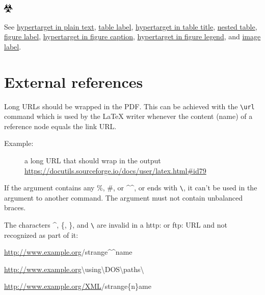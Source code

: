 \documentclass[a4paper]{article}
\newenvironment{DUlineblock}[1]{%
    \list{}{\setlength{\partopsep}{\parskip}
            \addtolength{\partopsep}{\baselineskip}
            \setlength{\topsep}{0pt}
            \setlength{\itemsep}{0.15\baselineskip}
            \setlength{\parsep}{0pt}
            \setlength{\leftmargin}{#1}}
    \raggedright
  }
  {\endlist}
\begin{document}
\includegraphics{../../../docs/user/rst/images/biohazard.png}
\label{image-label}

See \hyperref[hypertarget-in-plain-text]{hypertarget in plain text},
\hyperref[table-label]{table label}, \hyperref[hypertarget-in-table-title]{hypertarget in table title},
\hyperref[nested-table]{nested table},
\hyperref[figure-label]{figure label}, \hyperref[hypertarget-in-figure-caption]{hypertarget in figure caption},
\hyperref[hypertarget-in-figure-legend]{hypertarget in figure legend}, and
\hyperref[image-label]{image label}.


\section{External references%
  \label{external-references}%
}

Long URLs should be wrapped in the PDF. This can be achieved with the
\texttt{\textbackslash{}url} command which is used by the LaTeX writer whenever the content
(name) of a reference node equals the link URL.

\begin{description}
\item[{Example:}] 
a long URL that should wrap in the output
\url{https://docutils.sourceforge.io/docs/user/latex.html\#id79}
\end{description}

If the argument contains any \textquotedbl{}\%\textquotedbl{}, \textquotedbl{}\#\textquotedbl{}, or \textquotedbl{}\textasciicircum{}\textasciicircum{}\textquotedbl{}, or ends with \texttt{\textbackslash{}}, it can't
be used in the argument to another command. The argument must not contain
unbalanced braces.

The characters \textasciicircum{}, \{, \}, and \texttt{\textbackslash{}} are invalid in a \textquotedbl{}http:\textquotedbl{} or \textquotedbl{}ftp:\textquotedbl{} URL
and not recognized as part of it:

\begin{DUlineblock}{0em}
\item[] \url{http://www.example.org}/strange\textasciicircum{}\textasciicircum{}name
\item[] \url{http://www.example.org}\textbackslash{}using\textbackslash{}DOS\textbackslash{}paths\textbackslash{}
\item[] \url{http://www.example.org/XML}/strange\{n\}ame
\end{DUlineblock}
\end{document}
